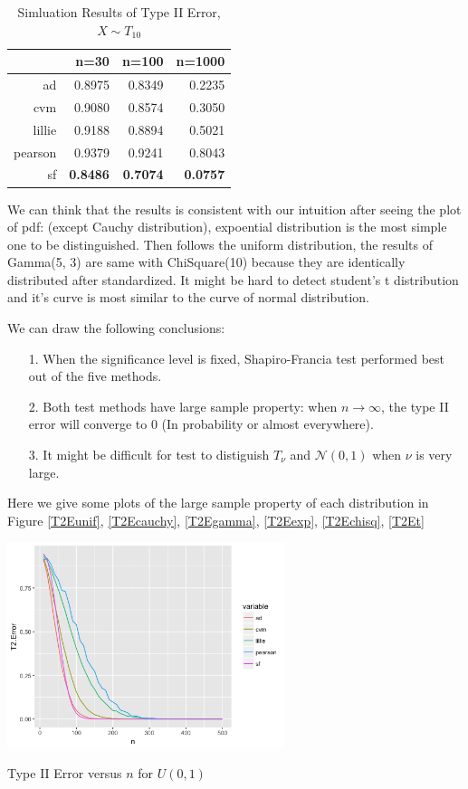 \documentclass[twoside]{article}
\begin{document}
\begin{table}[ht]
\centering
\begin{tabular}{rrrr}
  \hline
 & n=30 & n=100 & n=1000 \\ 
  \hline
ad & 0.8975 & 0.8349 & 0.2235 \\ 
  cvm & 0.9080 & 0.8574 & 0.3050 \\ 
  lillie & 0.9188 & 0.8894 & 0.5021 \\ 
  pearson & 0.9379 & 0.9241 & 0.8043 \\ 
  sf & \textbf{0.8486} & \textbf{0.7074} & \textbf{0.0757} \\ 
   \hline
\end{tabular}
\caption{Simluation Results of Type II Error, $X\sim T_{10}$}
\label{t2tablee}
\end{table}

We can think that the results is consistent with our intuition after seeing the plot of pdf: (except Cauchy distribution), expoential distribution is the most simple one to be distinguished. Then follows the uniform distribution, the results of Gamma(5, 3) are same with ChiSquare(10) because they are identically distributed after standardized. It might be hard to detect student's t distribution and it's curve is most similar to the curve of normal distribution.

We can draw the following conclusions:

\begin{itemize}
  \item[1.] When the significance level is fixed, Shapiro-Francia test performed best out of the five methods.
  \item[2.] Both test methods have large sample property: when $n \to \infty$, the type II error will converge to 0 (In probability or almost everywhere).
  \item[3.] It might be difficult for test to distiguish $T_\nu$ and $\mathcal{N}(0, 1)$ when $\nu$ is very large.
\end{itemize}

Here we give some plots of the large sample property of each distribution in Figure \ref{T2Eunif}, \ref{T2Ecauchy}, \ref{T2Egamma}, \ref{T2Eexp}, \ref{T2Echisq}, \ref{T2Et}

\begin{center}
\makeatletter
\def\@captype{figure}
\makeatother
\includegraphics [height=6cm]{code/uniform.png}
\caption{Type II Error versus $n$ for $U(0,1)$}
\label{T2Eunif}
\end{center}
\end{document}
